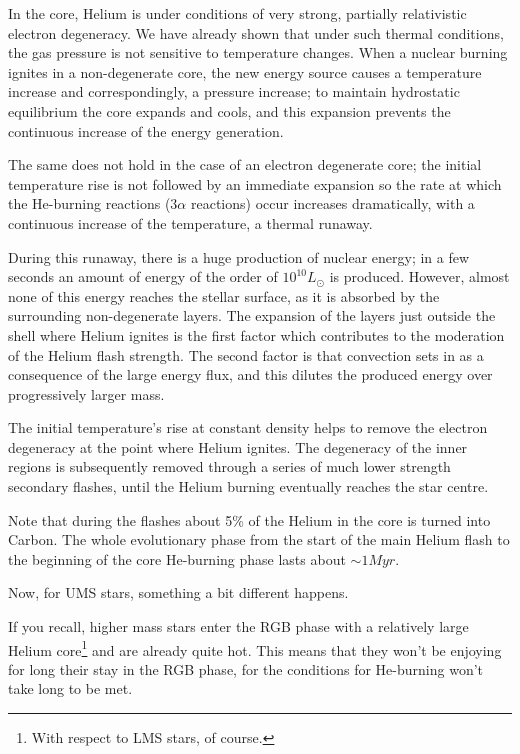 \par In the core, Helium is under conditions of very strong, partially relativistic electron degeneracy. We have already shown that under such thermal conditions, the gas pressure is not sensitive to temperature changes. When a nuclear burning ignites in a non-degenerate core, the new energy source causes a temperature increase and correspondingly, a pressure increase; to maintain hydrostatic equilibrium the core expands and cools, and this expansion prevents the continuous increase of the energy generation.
\par The same does not hold in the case of an electron degenerate core; the initial temperature rise is not followed by an immediate expansion so the rate at which the He-burning reactions ($3\alpha$ reactions) occur increases dramatically, with a continuous increase of the temperature, a thermal runaway.
\par During this runaway, there is a huge production of nuclear energy; in a few seconds an amount of energy of the order of $10^{10}L_{\odot}$ is produced. However, almost none of this energy reaches the stellar surface, as it is absorbed by the surrounding non-degenerate layers. The expansion of the layers just outside the shell where Helium ignites is the first factor which contributes to the moderation of the Helium flash strength. The second factor is that convection sets in as a consequence of the large energy flux, and this dilutes the produced energy over progressively larger mass.
\par The initial temperature's rise at constant density helps to remove the electron degeneracy at the point where Helium ignites. The degeneracy of the inner regions is subsequently removed through a series of much lower strength secondary flashes, until the Helium burning eventually reaches the star centre.
\par Note that during the flashes about 5\% of the Helium in the core is turned into Carbon. The whole evolutionary phase from the start of the main Helium flash to the beginning of the core He-burning phase lasts about $\sim 1 \unit{Myr}$.
\par Now, for UMS stars, something a bit different happens.
\par If you recall, higher mass stars enter the RGB phase with a relatively large Helium core\footnote{With respect to LMS stars, of course.} and are already quite hot. This means that they won't be enjoying for long their stay in the RGB phase, for the conditions for He-burning won't take long to be met.
